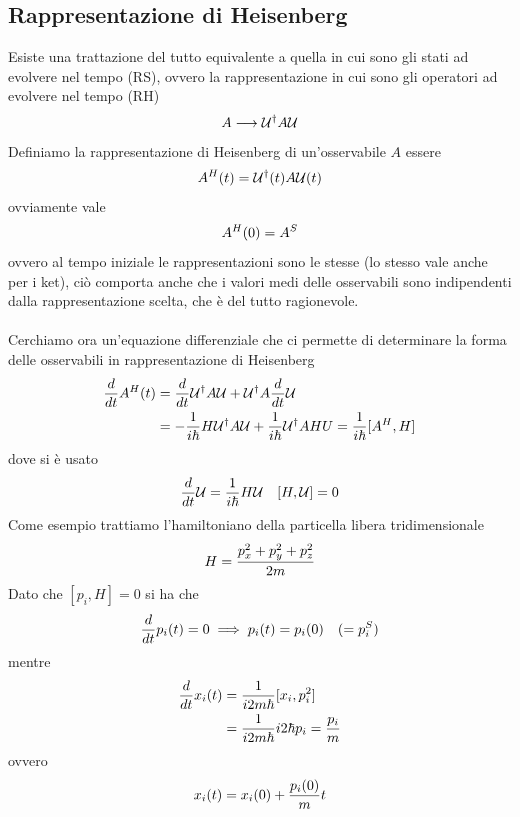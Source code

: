 \documentclass{article}
\begin{document}
\subsection{Rappresentazione di Heisenberg}
Esiste una trattazione del tutto equivalente a quella in cui sono gli stati ad evolvere nel tempo (RS), ovvero la rappresentazione in cui sono gli operatori ad evolvere nel tempo (RH)
\begin{gather}
    A \longrightarrow \mathcal{U}^\dagger A \mathcal{U} \notag
\end{gather}
Definiamo la rappresentazione di Heisenberg di un'osservabile $A$ essere
\begin{gather}
    A^H(t) = \mathcal{U}^\dagger(t) A \mathcal{U}(t) \notag
\end{gather}
ovviamente vale
\begin{gather}
    A^H(0) = A^S \notag
\end{gather}
ovvero al tempo iniziale le rappresentazioni sono le stesse (lo stesso vale anche per i ket), ciò comporta anche che i valori medi delle osservabili sono indipendenti dalla rappresentazione scelta, che è del tutto ragionevole. \\ \\
Cerchiamo ora un'equazione differenziale che ci permette di determinare la forma delle osservabili in rappresentazione di Heisenberg
\begin{align}
    \frac{d}{dt}A^H(t) &= \frac{d}{dt}\mathcal{U}^\dagger A\mathcal{U} + \mathcal{U}^\dagger A \frac{d}{dt}\mathcal{U} \notag \\
    &= -\frac{1}{i\hbar}H\mathcal{U}^\dagger A\mathcal{U} + \frac{1}{i\hbar}\mathcal{U}^\dagger AHU = \frac{1}{i\hbar}[A^H, H] \notag
\end{align}
dove si è usato
\begin{gather}
    \frac{d}{dt}\mathcal{U} = \frac{1}{i\hbar}H\mathcal{U} \quad [H, \mathcal{U}] = 0 \notag
\end{gather}
Come esempio trattiamo l'hamiltoniano della particella libera tridimensionale
\begin{gather}
    H = \frac{p_x^2 + p_y^2 + p_z^2}{2m} \notag
\end{gather}
Dato che $[p_i, H] = 0$ si ha che
\begin{gather}
    \frac{d}{dt}p_i(t) = 0 \implies p_i(t) = p_i(0) \quad (= p_i^S) \notag
\end{gather}
mentre
\begin{align}
    \frac{d}{dt}x_i(t) &= \frac{1}{i2m\hbar}[x_i, p_i^2] \notag \\
    &= \frac{1}{i2m\hbar}i2\hbar p_i = \frac{p_i}{m} \notag
\end{align}
ovvero
\begin{gather}
    x_i(t) = x_i(0) + \frac{p_i(0)}{m}t \notag
\end{gather}
\end{document}

